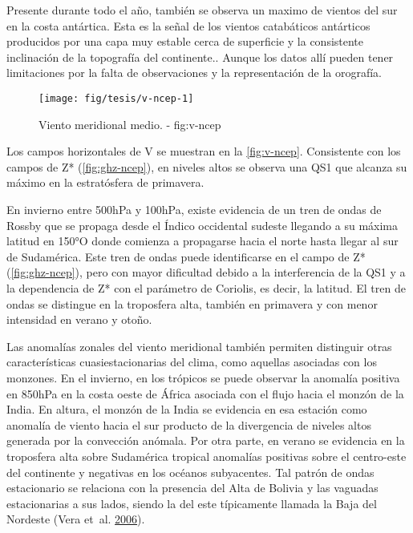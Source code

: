 \documentclass[spanish,a4paper,12p]{book}
\begin{document}
Presente durante todo el año, también se observa un maximo de vientos
del sur en la costa antártica. Esta es la señal de los vientos
catabáticos antárticos producidos por una capa muy estable cerca de
superficie y la consistente inclinación de la topografía del
continente.. Aunque los datos allí pueden tener
limitaciones por la falta de observaciones y la representación de la
orografía.

\begin{landscape}\begin{figure}

{\centering \texttt{[image: fig/tesis/v-ncep-1]} 

}

\caption{Viento meridional medio. - fig:v-ncep}\label{fig:v-ncep}
\end{figure}
\end{landscape}

Los campos horizontales de V se muestran en la \autoref{fig:v-ncep}.
Consistente con los campos de Z* (\autoref{fig:ghz-ncep}), en niveles
altos se observa una QS1 que alcanza su máximo en la estratósfera de
primavera.

En invierno entre 500hPa y 100hPa, existe evidencia de un tren de ondas
de Rossby que se propaga desde el Índico occidental sudeste llegando a
su máxima latitud en 150°O donde comienza a propagarse hacia el norte
hasta llegar al sur de Sudamérica. Este tren de ondas puede
identificarse en el campo de Z* (\autoref{fig:ghz-ncep}), pero con mayor
dificultad debido a la interferencia de la QS1 y a la dependencia de Z*
con el parámetro de Coriolis, es decir, la latitud. El tren de ondas se
distingue en la troposfera alta, también en primavera y con menor
intensidad en verano y otoño.

Las anomalías zonales del viento meridional también permiten distinguir
otras características cuasiestacionarias del clima, como aquellas
asociadas con los monzones. En el invierno, en los trópicos se puede
observar la anomalía positiva en 850hPa en la costa oeste de África
asociada con el flujo hacia el monzón de la India. En altura, el monzón
de la India se evidencia en esa estación como anomalía de viento hacia
el sur producto de la divergencia de niveles altos generada por la
convección anómala. Por otra parte, en verano se evidencia en la
troposfera alta sobre Sudamérica tropical anomalías positivas sobre el
centro-este del continente y negativas en los océanos subyacentes. Tal
patrón de ondas estacionario se relaciona con la presencia del Alta de
Bolivia y las vaguadas estacionarias a sus lados, siendo la del este
típicamente llamada la Baja del Nordeste (Vera et~al.
\protect\hyperlink{ref-Vera2006}{2006}).
\end{document}
